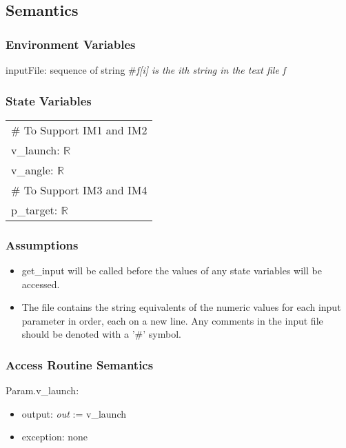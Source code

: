 \documentclass[12pt, titlepage]{article}
\begin{document}
\subsection{Semantics}

\subsubsection{Environment Variables}

inputFile: sequence of string \#\textit{f[i] is the ith string in the text file f}

\subsubsection{State Variables}

\renewcommand{\arraystretch}{1.2}
\begin{longtable*}[l]{l} 
\# To Support IM1 and IM2 \\
v\_launch: $\mathbb{R}$\\
v\_angle: $\mathbb{R}$\\
\# To Support IM3 and IM4 \\
p\_target: $\mathbb{R}$\\
\end{longtable*}

\subsubsection{Assumptions}

\begin{itemize}

\item get\_input will be called before the values of any state variables will 
be accessed.

\item The file contains the string equivalents of the numeric values for
each input parameter in order, each on a new line. Any comments in the input file 
should be denoted with a '\#' symbol.

\end{itemize}

\subsubsection{Access Routine Semantics}

\noindent Param.v\_launch:
\begin{itemize}
\item output: \textit{out} := v\_launch
\item exception: none
\end{itemize}
\end{document}
